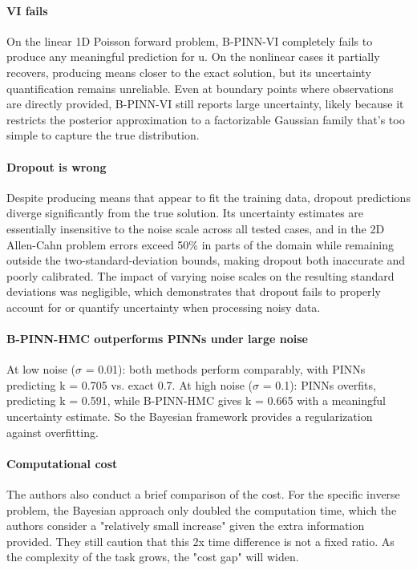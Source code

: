 \documentclass{article}
\begin{document}
\paragraph{VI fails} On the linear 1D Poisson forward problem, B-PINN-VI completely fails to produce any meaningful prediction for u. On the nonlinear cases it partially recovers, producing means closer to the exact solution, but its uncertainty quantification remains unreliable. Even at boundary points where observations are directly provided, B-PINN-VI still reports large uncertainty, likely because it restricts the posterior approximation to a factorizable Gaussian family that's too simple to capture the true distribution.

\paragraph{Dropout is wrong} Despite producing means that appear to fit the training data, dropout predictions diverge significantly from the true solution. Its uncertainty estimates are essentially insensitive to the noise scale across all tested cases, and in the 2D Allen-Cahn problem errors exceed 50\% in parts of the domain while remaining outside the two-standard-deviation bounds, making dropout both inaccurate and poorly calibrated. The impact of varying noise scales on the resulting standard deviations was negligible, which demonstrates that dropout fails to properly account for or quantify uncertainty when processing noisy data.

\paragraph{B-PINN-HMC outperforms PINNs under large noise} At low noise ($\sigma$ = 0.01): both methods perform comparably, with PINNs predicting k = 0.705 vs. exact 0.7. At high noise ($\sigma$ = 0.1): PINNs overfits, predicting k = 0.591, while B-PINN-HMC gives k = 0.665 with a meaningful uncertainty estimate. So the Bayesian framework provides a regularization against overfitting.

\paragraph{Computational cost} The authors also conduct a brief comparison of the cost. For the specific inverse problem, the Bayesian approach only doubled the computation time, which the authors consider a "relatively small increase" given the extra information provided. They still caution that this 2x time difference is not a fixed ratio. As the complexity of the task grows, the "cost gap" will widen.
\end{document}
